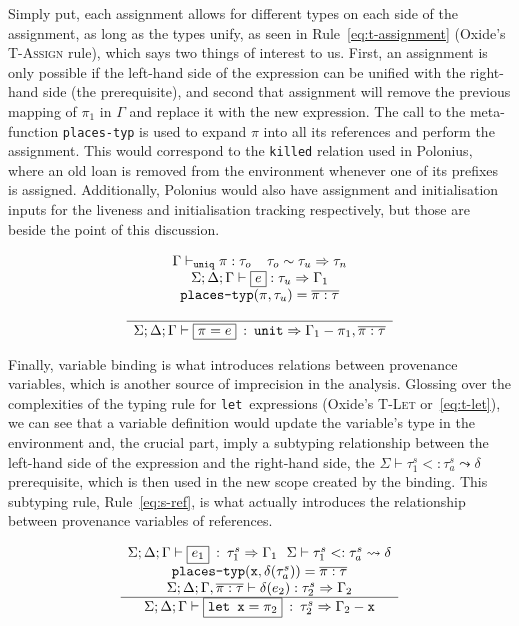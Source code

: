 \documentclass[11pt,a4paper,twoside,openany,draft]{report}
\newcommand{\InRust}[1]{\texttt{#1}}
\newcommand{\InDatalog}[1]{\texttt{#1}}
\newcommand{\expression}[1]{\boxed{#1}}
\newcommand{\ntyperule}[2]{\begin{array}{c}#1\\\hline\raisebox{1pt}{\strut}#2\end{array}}
\begin{document}
Simply put, each assignment allows for different types on each side of the
assignment, as long as the types unify, as seen in Rule~\eqref{eq:t-assignment}
(Oxide's \textsc{T-Assign} rule), which says two things of interest to us.
First, an assignment is only possible if the left-hand side of the expression
can be unified with the right-hand side (the prerequisite), and second that
assignment will remove the previous mapping of $\pi_1$ in $\Gamma$ and replace
it with the new expression. The call to the meta-function \texttt{places-typ} is
used to expand $\pi$ into all its references and perform the assignment. This
would correspond to the \InDatalog{killed} relation used in Polonius, where an
old loan is removed from the environment whenever one of its prefixes is
assigned. Additionally, Polonius would also have assignment and initialisation
inputs for the liveness and initialisation tracking respectively, but those are
beside the point of this discussion.

\begin{equation}\label{eq:t-assignment}
  \ntyperule{
    \Gamma \vdash_{\texttt{uniq}} \pi : \tau_o \:\:\:\:\:
    \tau_o \sim \tau_u \Rightarrow \tau_n \\
    \Sigma ; \Delta ; \Gamma \vdash \expression{e} : \tau_u \Rightarrow \Gamma_1 \\
    \texttt{places-typ}(\pi, \tau_u) = \overline{\pi : \tau} \\
  }
  {
    \Sigma ; \Delta ; \Gamma \vdash \expression{\pi = e} \: : \: \texttt{unit} \Rightarrow \Gamma_1 - \pi_1, \overline{\pi : \tau}
  }
\end{equation}

Finally, variable binding is what introduces relations between provenance
variables, which is another source of imprecision in the analysis. Glossing over
the complexities of the typing rule for \InRust{let}~expressions (Oxide's
\textsc{T-Let} or~\eqref{eq:t-let}), we can see that a variable definition would
update the variable's type in the environment and, the crucial part, imply a
subtyping relationship between the left-hand side of the expression and the
right-hand side, the $\Sigma \vdash \tau_1 ^s <: \tau_a^s \leadsto \delta$
prerequisite, which is then used in the new scope created by the binding. This
subtyping rule, Rule~\eqref{eq:s-ref}, is what actually introduces the
relationship between provenance variables of references.

\begin{equation}\label{eq:t-let}
  \ntyperule{
    \Sigma ; \Delta ; \Gamma \vdash \expression{e_1} \: : \: \tau_1^s \Rightarrow \Gamma_1
    \:\:\: \Sigma \vdash \tau_1 ^s <: \tau_a^s \leadsto \delta \\
    \texttt{places-typ}(\mathtt{x}, \delta(\tau^s_a)) = \overline{\pi : \tau} \\
    \Sigma ; \Delta ; \Gamma, \overline{\pi : \tau} \vdash \delta(e_2) : \tau_2^s \Rightarrow \Gamma_2
  }
  {\Sigma ; \Delta ; \Gamma \vdash \expression{\texttt{let } \mathtt{x} = \pi_2} \: : \: \tau_2^s \Rightarrow \Gamma_2 - \mathtt{x}}
\end{equation}
\end{document}

